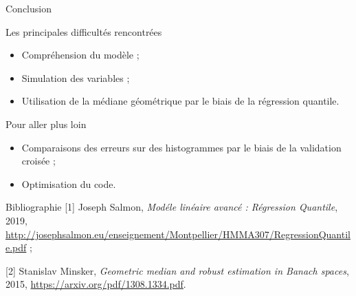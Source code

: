 \documentclass[unknownkeysallowed]{beamer}
\begin{document}
\begin{frame}{Conclusion}
\begin{block}{Les principales difficultés rencontrées}
\begin{itemize}
    \item Compréhension du modèle ;
    \item Simulation des variables ;
    \item Utilisation de la médiane géométrique par le biais de la régression quantile.
\end{itemize}
\end{block}
\vspace{0.5cm}
\begin{block}{Pour aller plus loin}
\begin{itemize}
    \item Comparaisons des erreurs sur des histogrammes par le biais de la validation croisée ;
    \item Optimisation du code.
\end{itemize}
\end{block}
\end{frame}

\begin{frame}{Bibliographie}
[1] Joseph Salmon, \textit{Modéle linéaire avancé : Régression Quantile}, 2019, \url{http://josephsalmon.eu/enseignement/Montpellier/HMMA307/RegressionQuantile.pdf} ; 

[2] Stanislav Minsker, \textit{Geometric median and robust estimation in Banach spaces}, 2015, \url{https://arxiv.org/pdf/1308.1334.pdf}. 

\printbibliography
\end{frame}
\end{document}
